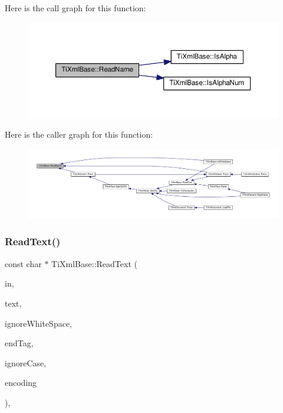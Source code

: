 Here is the call graph for this function\+:\nopagebreak
\begin{figure}[H]
\begin{center}
\leavevmode
\includegraphics[width=350pt]{class_ti_xml_base_a1c21a6ab5f7b503acd91f35f183734b3_cgraph}
\end{center}
\end{figure}
Here is the caller graph for this function\+:\nopagebreak
\begin{figure}[H]
\begin{center}
\leavevmode
\includegraphics[width=350pt]{class_ti_xml_base_a1c21a6ab5f7b503acd91f35f183734b3_icgraph}
\end{center}
\end{figure}
\mbox{\label{class_ti_xml_base_aa646c74921aa33156968b802bbf5566e}} 
\subsubsection{\texorpdfstring{Read\+Text()}{ReadText()}}
{\footnotesize\ttfamily const char $\ast$ Ti\+Xml\+Base\+::\+Read\+Text (\begin{DoxyParamCaption}\item[{const char $\ast$}]{in,  }\item[{\hyperlink{tinyxml_8h_a92bada05fd84d9a0c9a5bbe53de26887}{T\+I\+X\+M\+L\+\_\+\+S\+T\+R\+I\+NG} $\ast$}]{text,  }\item[{bool}]{ignore\+White\+Space,  }\item[{const char $\ast$}]{end\+Tag,  }\item[{bool}]{ignore\+Case,  }\item[{\hyperlink{tinyxml_8h_a88d51847a13ee0f4b4d320d03d2c4d96}{Ti\+Xml\+Encoding}}]{encoding }\end{DoxyParamCaption})\hspace{0.3cm}{\ttfamily [static]}, {\ttfamily [protected]}}

